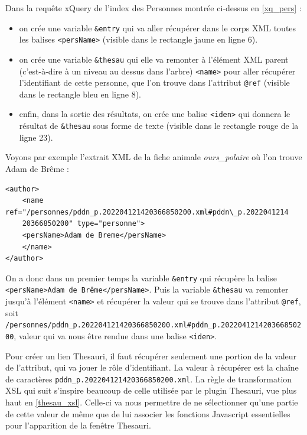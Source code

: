 \documentclass[a4paper,12pt,twoside]{book}
\begin{document}
Dans la requête xQuery de l'index des Personnes montrée ci-dessus en \ref{xq_pers} :
\begin{itemize}
    \item on crée une variable \texttt{\&entry} qui va aller récupérer dans le corps XML toutes les balises \texttt{<persName>} (visible dans le rectangle jaune en ligne 6).
    \item on crée une variable \texttt{\&thesau} qui elle va remonter à l'élément XML parent (c'est-à-dire à un niveau au dessus dans l'arbre) \texttt{<name>} pour aller récupérer l'identifiant de cette personne, que l'on trouve dans l'attribut \texttt{@ref} (visible dans le rectangle bleu en ligne 8).
    \item enfin, dans la sortie des résultats, on crée une balise \texttt{<iden>} qui donnera le résultat de \texttt{\&thesau} sous forme de texte (visible dans le rectangle rouge de la ligne 23).
\end{itemize}


Voyons par exemple l'extrait XML de la fiche animale \textit{ours\_polaire} où l'on trouve Adam de Brême :\\


\begin{verbatim}
<author>
    <name ref="/personnes/pddn_p.202204121420366850200.xml#pddn\_p.2022041214
    20366850200" type="personne">
    <persName>Adam de Breme</persName>
    </name>
</author>
\end{verbatim}

On a donc dans un premier temps la variable \texttt{\&entry} qui récupère la balise \texttt{<persName>Adam de Brême</persName>}. Puis la variable \texttt{\&thesau} va remonter jusqu'à l'élément \texttt{<name>} et récupérer la valeur qui se trouve dans l'attribut \texttt{@ref}, soit \texttt{/personnes/pddn\_p.202204121420366850200.xml\#pddn\_p.202204121420366850200}, valeur qui va nous être rendue dans une balise \texttt{<iden>}.



Pour créer un lien Thesauri, il faut récupérer seulement une portion de la valeur de l'attribut, qui va jouer le rôle d'identifiant. La valeur à récupérer est la chaîne de caractères \texttt{pddn\_p.202204121420366850200.xml}. La règle de transformation \acrshort{XSL} qui suit s'inspire beaucoup de celle utilisée par le plugin Thesauri, vue plus haut en \ref{thesau_xsl}. Celle-ci va nous permettre de ne sélectionner qu'une partie de cette valeur de même que de lui associer les fonctions Javascript essentielles pour l'apparition de la fenêtre Thesauri.
\end{document}
